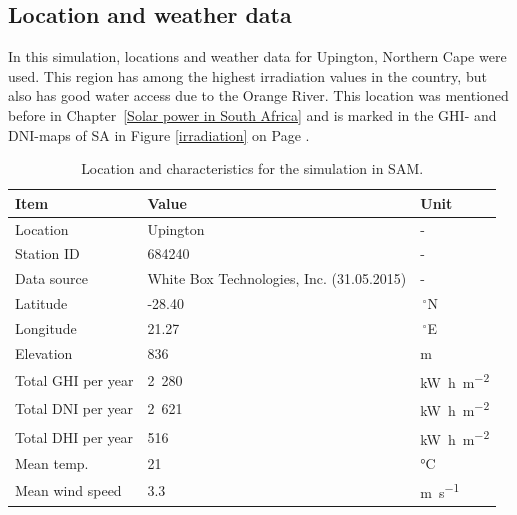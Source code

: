 \subsection{Location and weather data} \label{Location and weather data}
In this simulation, locations and weather data for Upington, Northern Cape were used. This region has among the highest irradiation values in the country, but also has good water access due to the Orange River. This location was mentioned before in Chapter~\ref{Solar power in South Africa} and is marked in the GHI- and DNI-maps of SA in Figure \ref{irradiation} on Page \pageref{irradiation}. 
 
\begin{table}[!h]  
  \centering
	\begin{tabular}{  p{4.0cm}  C{4.0cm}  C{3.0cm} } 

	\hline	
\textbf{Item}  & \textbf{Value} & \textbf{Unit} \\ \hline \hline
Location & Upington & -\\ 
Station ID &  684240& -  \\ 
Data source & White Box Technologies, Inc. (31.05.2015) & -\\ \hline
Latitude & -28.40 &$\,^{\circ}$N \\ 
Longitude &  21.27 &$\,^{\circ}$E \\ 
Elevation &  836 & m \\ 
Total GHI per year  &  2~280 & \si{\kilo\watt\hour\per\square\metre}\\ 
Total DNI per year &  2~621 & \si{\kilo\watt\hour\per\square\metre}\\ 
Total DHI per year &  516 & \si{\kilo\watt\hour\per\square\metre}\\ 
Mean temp. &  21 & \si{\celsius}\\ 
Mean wind speed & 3.3 & \si{\metre\per\second}\\ \hline
\end{tabular}
\caption[Location and characteristics for the simulation in SAM.]{Location and characteristics for the simulation in SAM.}\label{tbl: Location}
\end{table}


